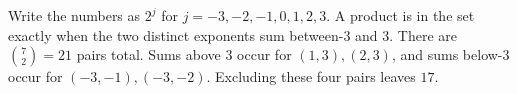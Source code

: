 Write the numbers as $2^j$ for $j=-3,-2,-1,0,1,2,3$. A product is in the set exactly when the two distinct exponents sum between-3 and 3. There are $\binom 72=21$ pairs total. Sums above 3 occur for $(1,3),(2,3)$, and sums below-3 occur for $(-3,-1),(-3,-2)$. Excluding these four pairs leaves $\boxed{17}$.
